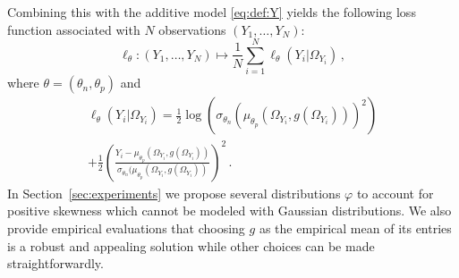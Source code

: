 \documentclass{article}
\begin{document}
Combining this with the additive model  \eqref{eq:def:Y} yields the following loss function associated with $N$ observations $(Y_1,\ldots,Y_N)$:
$$
\ell_{\theta}: (Y_1,\ldots,Y_N) \mapsto \frac{1}{N}\sum_{i=1}^N \ell_{\theta}(Y_i|\Omega_{Y_i})\,,
$$
where $\theta = (\theta_n,\theta_p)$ and
\begin{multline*}
\ell_{\theta}(Y_i|\Omega_{Y_i}) = \frac{1}{2}\log(\sigma_{\theta_n}( \mu_{\theta_p}(\Omega_{Y_i},g(\Omega_{Y_i})))^2) \\
+\frac{1}{2}\left(\frac{Y_i-\mu_{\theta_p}(\Omega_{Y_i},g(\Omega_{Y_i}))}{\sigma_{\theta_n}(\mu_{\theta_p}(\Omega_{Y_i},g(\Omega_{Y_i}))}\right)^2\,. %
\end{multline*}
In Section~\ref{sec:experiments} we propose several distributions $\varphi$ to account for positive skewness which cannot be modeled with Gaussian distributions. We also provide empirical evaluations that choosing $g$ as the empirical mean of its entries is a robust and appealing solution while other choices can be made straightforwardly.




\end{document}
